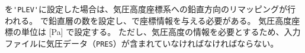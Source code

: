 を\verb|'PLEV'|に設定した場合は、気圧高度座標系への鉛直方向のリマッピングが行われる。
で鉛直層の数を設定し、で座標情報を与える必要がある。
気圧高度座標の単位は [Pa] で設定する。
ただし、気圧高度の情報を必要とするため、入力ファイルに気圧データ（\verb|PRES|）が含まれていなければなければならない。
